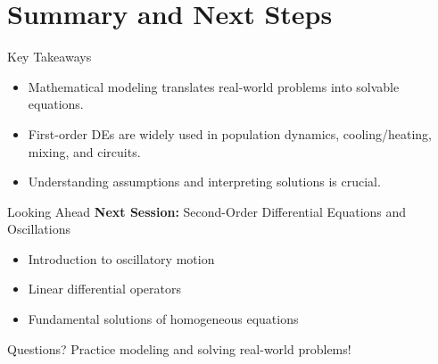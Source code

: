 \documentclass[10pt,aspectratio=169]{beamer}
\begin{document}
\section{Summary and Next Steps}
\begin{frame}{Key Takeaways}
    \begin{itemize}
        \item Mathematical modeling translates real-world problems into solvable equations.
        \item First-order DEs are widely used in population dynamics, cooling/heating, mixing, and circuits.
        \item Understanding assumptions and interpreting solutions is crucial.
    \end{itemize}
\end{frame}

\begin{frame}{Looking Ahead}
    \textbf{Next Session:} Second-Order Differential Equations and Oscillations
    \begin{itemize}
        \item Introduction to oscillatory motion
        \item Linear differential operators
        \item Fundamental solutions of homogeneous equations
    \end{itemize}
\end{frame}

\begin{frame}[standout]
    Questions?\newline
    Practice modeling and solving real-world problems!
\end{frame}
\end{document}
